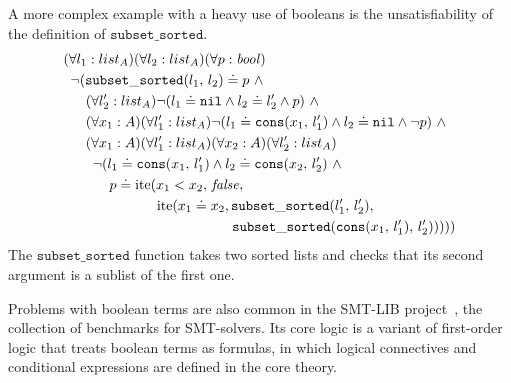 A more complex example with a heavy use of booleans is the unsatisfiability of the definition of $\mathtt{subset\_sorted}$.
\begin{gather}\label{formula:subset-sorted}
\begin{aligned}
&(\forall\ofsort{l_1}{list_A})(\forall\ofsort{l_2}{list_A})(\forall\ofsort{p}{\bool}) \\
&\hspace{0.5em}\neg (\mathtt{subset\_sorted}(l_1,\,l_2) \doteq p ~\wedge \\
&\hspace{1.6em}      (\forall\ofsort{l_2'}{list_A})\neg (l_1 \doteq \mathtt{nil} \wedge l_2 \doteq l_2' \wedge p) ~\wedge \\
&\hspace{1.6em}      (\forall\ofsort{x_1}{A})(\forall\ofsort{l_1'}{list_A})\neg (l_1 \doteq \mathtt{cons}(x_1,\,l_1') \wedge l_2 \doteq \mathtt{nil} \wedge \neg p) ~\wedge \\
&\hspace{1.6em}      (\forall\ofsort{x_1}{A})(\forall\ofsort{l_1'}{list_A})(\forall\ofsort{x_2}{A})(\forall\ofsort{l_2'}{list_A}) \\
&\hspace{2.1em}       \neg (l_1 \doteq \mathtt{cons}(x_1,\,l_1') \wedge l_2 \doteq \mathtt{cons}(x_2,\,l_2') ~\wedge \\
&\hspace{3.3em}       p \doteq \mathrm{ite}(x_1 < x_2,\,\false,\\
&\hspace{6.7em}                             \mathrm{ite}(x_1 \doteq x_2,\mathtt{subset\_sorted}(l_1',\,l_2'), \\
&\hspace{12.1em}                                        \mathtt{subset\_sorted}(\mathtt{cons}(x_1,\,l_1'),\,l_2')))))
\end{aligned}
\end{gather}
The $\mathtt{subset\_sorted}$ function takes two sorted lists and checks that its second argument is a sublist of the first one.

Problems with boolean terms are also common in the SMT-LIB project~\cite{SMT-LIB}, the collection of benchmarks for SMT-solvers. Its core logic is a variant of first-order logic that treats boolean terms as formulas, in which logical connectives and conditional expressions are defined in the core theory.


